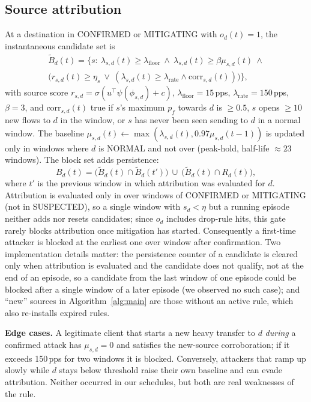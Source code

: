 \documentclass[conference]{IEEEtran}
\begin{document}
\subsection{Source attribution}\label{sec:attr}
At a destination in CONFIRMED or MITIGATING with $o_d(t)=1$, the instantaneous candidate set is
\begin{multline}
\tilde B_d(t)=\big\{s:\ \lambda_{s,d}(t)\ge\lambda_{\text{floor}}\ \wedge\ \lambda_{s,d}(t)\ge\beta\mu_{s,d}(t)\ \wedge\\
\big(r_{s,d}(t)\ge\eta_s\ \lor\ (\lambda_{s,d}(t)\ge\lambda_{\text{rate}}\wedge \mathrm{corr}_{s,d}(t))\big)\big\},
\end{multline}
with source score $r_{s,d}=\sigma(u^\top\psi(\phi_{s,d})+c)$, $\lambda_{\text{floor}}=15$\,pps, $\lambda_{\text{rate}}=150$\,pps, $\beta=3$, and $\mathrm{corr}_{s,d}(t)$ true if $s$'s maximum $p_f$ towards $d$ is $\ge0.5$, $s$ opens $\ge10$ new flows to $d$ in the window, or $s$ has never been seen sending to $d$ in a normal window. The baseline $\mu_{s,d}(t)\leftarrow\max(\lambda_{s,d}(t),0.97\mu_{s,d}(t-1))$ is updated only in windows where $d$ is NORMAL and not over (peak-hold, half-life $\approx23$ windows). The block set adds persistence:
\begin{equation}
B_d(t)=\big(\tilde B_d(t)\cap\tilde B_d(t')\big)\ \cup\ \big(\tilde B_d(t)\cap R_d(t)\big),
\end{equation}
where $t'$ is the previous window in which attribution was evaluated for $d$. Attribution is evaluated only in over windows of CONFIRMED or MITIGATING (not in SUSPECTED), so a single window with $s_d<\eta$ but a running episode neither adds nor resets candidates; since $o_d$ includes drop-rule hits, this gate rarely blocks attribution once mitigation has started. Consequently a first-time attacker is blocked at the earliest one over window after confirmation. Two implementation details matter: the persistence counter of a candidate is cleared only when attribution is evaluated and the candidate does not qualify, not at the end of an episode, so a candidate from the last window of one episode could be blocked after a single window of a later episode (we observed no such case); and ``new'' sources in Algorithm~\ref{alg:main} are those without an active rule, which also re-installs expired rules.

\textbf{Edge cases.} A legitimate client that starts a new heavy transfer to $d$ \emph{during} a confirmed attack has $\mu_{s,d}=0$ and satisfies the new-source corroboration; if it exceeds 150\,pps for two windows it is blocked. Conversely, attackers that ramp up slowly while $d$ stays below threshold raise their own baseline and can evade attribution. Neither occurred in our schedules, but both are real weaknesses of the rule.
\end{document}
